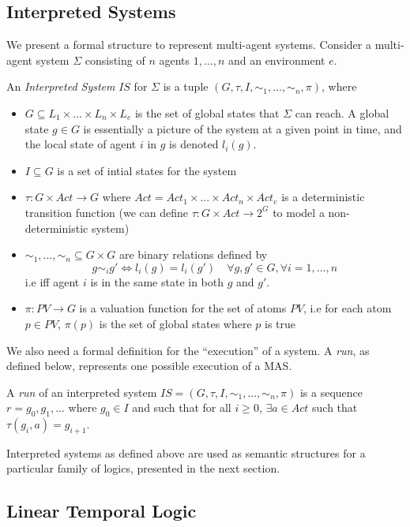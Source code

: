 \documentclass[11pt]{report}
\newenvironment{definition}[1][Definition]{\begin{trivlist}
\item[\hskip \labelsep {\bfseries #1}]}{\end{trivlist}}
\begin{document}
\subsection{Interpreted Systems}
\label{IS}
We present a formal structure to represent multi-agent systems. Consider a multi-agent system $\Sigma$ consisting of $n$ agents $1, ..., n$ and an environment $e$.
\begin{definition}
An \textit{Interpreted System} $IS$ for $\Sigma$ is a tuple $(G, \tau, I, \sim_1, ..., \sim_n, \pi)$, where
\begin{itemize}
\item $G \subseteq L_1 \times ... \times L_n \times L_e$ is the set of global states that $\Sigma$ can reach. A global state $g \in G$ is essentially a picture of the system at a given point in time, and the local state of agent $i$ in $g$ is denoted $l_i(g)$.
\item $I \subseteq G$ is a set of intial states for the system
\item $\tau : G \times Act \rightarrow G $ where $Act = Act_1 \times ... \times Act_n \times Act_e$ is a deterministic transition function (we can define $\tau : G \times Act \rightarrow 2^G$ to model a non-deterministic system)
\item $\sim_1, ..., \sim_n \subseteq G \times G$  are binary relations defined by $$g \sim_i g' \Leftrightarrow l_i(g) = l_i(g') \quad \forall g, g' \in G, \forall i = 1, ..., n$$
i.e iff agent $i$ is in the same state in both $g$ and $g'$. 
\item $\pi : PV \rightarrow G$ is a valuation function for the set of atoms $PV$, i.e for each atom $p \in PV$, $\pi(p)$ is the set of global states where $p$ is true
\end{itemize}
\end{definition}
We also need a formal definition for the ``execution'' of a system. A \emph{run}, as defined below, represents one possible execution of a MAS. 
\begin{definition} 
A \emph{run} of an interpreted system $IS = (G, \tau, I, \sim_1, ..., \sim_n, \pi)$ is a sequence $r = g_0, g_1, ...$ where $g_0 \in I$ and such that for all $i \geq 0$, $\exists a \in Act$ such that $\tau(g_i, a) = g_{i+1}$.
\end{definition}

Interpreted systems as defined above are used as semantic structures for a particular family of logics, presented in the next section.

\subsection{Linear Temporal Logic} 
\label{LTL}
\end{document}
